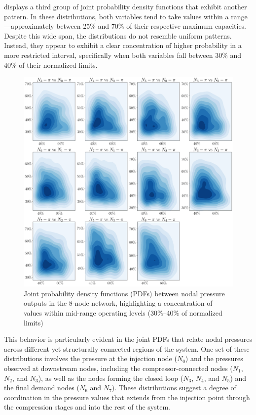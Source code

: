  displays a third group of joint probability density functions that exhibit another pattern. In these distributions, both variables tend to take values within a range—approximately between 25\% and 70\% of their respective maximum capacities. Despite this wide span, the distributions do not resemble uniform patterns. Instead, they appear to exhibit a clear concentration of higher probability in a more restricted interval, specifically when both variables fall between 30\% and 40\% of their normalized limits.

\begin{figure}[htbp]
    \begin{center}
        \includegraphics[width=.7\textwidth]{figures/Chapter_NonLinealCensnet/outputs_outputs_3.png}
    \end{center}
    \caption{Joint probability density functions (PDFs) between nodal pressure outputs in the 8-node network, highlighting a concentration of values within mid-range operating levels (30\%–40\% of normalized limits)}
    \label{fig:joint_distributions_output_output_3}
\end{figure}
 

This behavior is particularly evident in the joint PDFs that relate nodal pressures across different yet structurally connected regions of the system. One set of these distributions involves the pressure at the injection node ($N_0$) and the pressures observed at downstream nodes, including the compressor-connected nodes ($N_1$, $N_2$, and $N_3$), as well as the nodes forming the closed loop ($N_3$, $N_4$, and $N_5$) and the final demand nodes ($N_6$ and $N_7$). These distributions suggest a degree of coordination in the pressure values that extends from the injection point through the compression stages and into the rest of the system.

